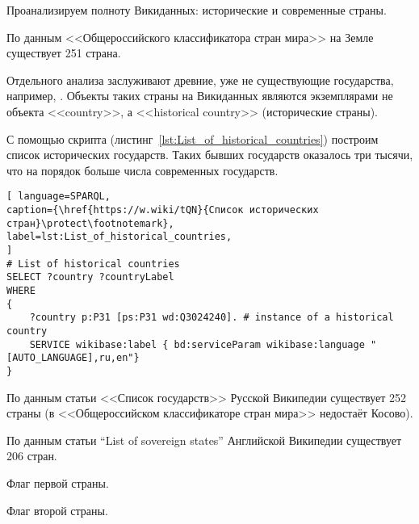 Проанализируем полноту Викиданных: исторические и современные страны.

По данным <<Общероссийского классификатора стран мира>>\cite{oksm} на Земле существует 251 страна.

Отдельного анализа заслуживают древние, уже не существующие государства, например, . Объекты таких страны на Викиданных являются экземплярами не объекта <<country>>, а  <<historical country>> (исторические страны). 

С помощью скрипта (листинг~\ref{lst:List_of_historical_countries}) построим список исторических государств. Таких бывших государств оказалось три тысячи, что на порядок больше числа современных государств.

\begin{lstlisting}[ language=SPARQL, 
caption={\href{https://w.wiki/tQN}{Список исторических стран}\protect\footnotemark},
label=lst:List_of_historical_countries, 
]
# List of historical countries
SELECT ?country ?countryLabel
WHERE
{
	?country p:P31 [ps:P31 wd:Q3024240]. # instance of a historical country 
	SERVICE wikibase:label { bd:serviceParam wikibase:language "[AUTO_LANGUAGE],ru,en"} 
}
\end{lstlisting}



По данным статьи <<Список государств>>\cite{list_of_sovereign_states} Русской Википедии существует 252 страны (в  <<Общероссийском классификаторе стран мира>> недостаёт Косово).

По данным статьи ``List of sovereign states''\cite{list_of_sovereign_states_en} Английской Википедии существует 206 стран.

\begin{marginfigure}[0.0cm]
	{
		\setlength{\fboxsep}{0pt}%
		\setlength{\fboxrule}{1pt}%
	}
	\caption{Флаг первой страны.}%
	\label{fig:flag_kor}%
\end{marginfigure}
\begin{marginfigure}[0.0cm]
	{
		\setlength{\fboxsep}{0pt}%
		\setlength{\fboxrule}{1pt}%
	}
	\caption{Флаг второй страны.}%
	\label{fig:flag_singapore}%
\end{marginfigure}


